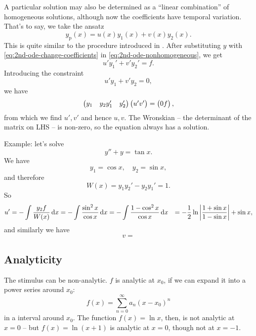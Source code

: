 \documentclass[hyperref, a4paper]{article}
\def\\{}%
\begin{document}
A particular solution may also be determined as 
a ``linear combination'' of homogeneous solutions,
although now the coefficients have temporal variation.
That's to say, we take the ansatz 
\begin{equation}
    y_{\text{p}}(x) = u(x) y_1(x) + v(x) y_2(x).
    \label{eq:2nd-ode-change-coefficients}
\end{equation}
This is quite similar to the procedure introduced in .
After substituting $y$ with \eqref{eq:2nd-ode-change-coefficients} 
in \eqref{eq:2nd-ode-nonhomogeneous},
we get 
\begin{equation}
    u' y_1' + v' y_2' = f.
\end{equation}
Introducing the constraint 
\begin{equation}
    u' y_1 + v' y_2 = 0,
\end{equation}
we have 
\begin{equation}
    \pmqty{y_1 & y_2 \\ y_1' & y_2'} 
    \pmqty{u' \\ v'} = \pmqty{0 \\ f},
\end{equation}
from which we find $u', v'$ and hence $u, v$.
The Wronskian -- the determinant of the matrix on LHS -- 
is non-zero, so the equation always has a solution.

Example: let's solve 
\begin{equation}
    y'' + y = \tan x. 
\end{equation}
We have 
\[
    y_1 = \cos x, \quad y_2 = \sin x,
\]
and therefore 
\[
    W(x) = y_1 y_2' - y_2 y_1' = 1.
\]
So 
\[
    \begin{aligned}
        u' &= - \int \frac{y_2 f}{W(x)} \dd{x} = - \int \frac{\sin^2 x}{\cos x} \dd{x} 
        = - \int \frac{1 - \cos^2 x}{\cos x} \dd{x} \\
        &= - \frac{1}{2} \ln \abs{
            \frac{1 + \sin x}{1 - \sin x}
        } + \sin x,
    \end{aligned}
\]
and similarly we have 
\[
    v = 
\]

\subsection{Analyticity}

The stimulus can be non-analytic.
$f$ is analytic at $x_0$, if we can expand it into a power series around $x_0$:
\begin{equation}
    f(x) = \sum_{n=0}^\infty a_n (x - x_0)^n 
\end{equation}
in a interval around $x_0$.
The function $f(x) = \ln x$, then, is not analytic at $x = 0$ -- 
but $f(x) = \ln (x + 1)$ is analytic at $x=0$,
though not at $x=-1$.
\end{document}
